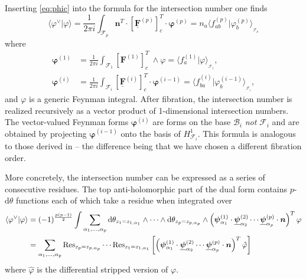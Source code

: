 \documentclass[11pt]{article}
\renewcommand{\d}{\text{d}}
\newcommand{\be}{\begin{equation}}
\newcommand{\ee}{\end{equation}}
\newcommand{\F}{\mathcal{F}}
\newcommand{\B}{\mathcal{B}}
\newcommand{\res}{{\rm Res}}
\newcommand{\vphi}{\varphi}
\newcommand{\bs}[1]{\boldsymbol{#1}}
\newcommand{\mat}[1]{\underline{\boldsymbol{#1}}}
\begin{document}
Inserting \eqref{eq:phic} into the formula for the intersection number one finds 
\be \label{eq:multivariate intersection number}
	\langle \vphi^\vee \vert \vphi \rangle
	= \frac{1}{2 \pi i} \int_{\F_p}  \bs{n}^T \cdot [\mat{F}^{(p)}]_c^T \cdot \bs{\vphi}^{(p)}
	= n_a \langle f^{(p)}_{ab} \vert \vphi^{(p)}_b \rangle_{_{\F_p}}
\ee
where 
\begin{align} \label{eq:phi(1)}
	\bs{\vphi}^{(1)} &= \frac{1}{2 \pi i} \int_{\F_{1}} [\bs{F}^{(1)}]_c^T\ \wedge \vphi 
		= \langle f^{(1)}_a \vert \vphi \rangle_{_{\F_1}},
	\\ \label{eq:phi(i)}
	\bs{\vphi}^{(i)} &= \frac{1}{2 \pi i} \int_{\F_{i}} [\underline{\bs{F}}^{(i)}]_c^T \cdot \bs{\vphi}^{(i-1)}
		= \langle f^{(i)}_{ba} \vert \vphi^{(i-1)}_b \rangle_{_{\F_i}},
\end{align}
and $\vphi$ is a generic Feynman integral. After fibration, the intersection number is realized recursively as a vector product of 1-dimensional intersection numbers. The vector-valued Feynman forms $\bs{\vphi}^{(i)}$ are forms on the base $\B_i$ \emph{not} $\F_i$ and are obtained by projecting $\bs{\vphi}^{(i-1)}$ onto the basis of $H_{\F_i}^1$. This formula is analogous to those derived in \cite{Mizera:2019gea,Frellesvig:2019uqt} -- the difference being that we have chosen a different fibration order. 

More concretely, the intersection number can be expressed as a series of consecutive residues. The top anti-holomorphic part of the dual form contains $p$-$\d\theta$ functions each of which take a residue when integrated over
\begin{align}
	\langle \vphi^\vee \vert \vphi \rangle
	&= (-1)^\frac{p(p-1)}{2} \int \sum_{\alpha_1,\dots,\alpha_p} 
		\d\theta_{z_1 = z_{1,\alpha_1}} \wedge  \cdots \wedge \d\theta_{z_p = z_{p,\alpha_p}} \wedge 
		\left(
			\bs{\psi}^{(1)}_{\alpha_1} \cdot \underline{\bs{\psi}}^{(2)}_{\alpha_2} 
			\cdots \underline{\bs{\psi}}^{(p)}_{\alpha_p} \cdot \bs{n}
		\right)^T \vphi
	\nonumber \\
	&= \sum_{\alpha_1,\dots,\alpha_p} 
		\res_{z_p = z_{p,\alpha_p}}  \cdots \res_{z_1 = z_{1,\alpha_1}} 
		\left[
			\left(
				\bs{\psi}^{(1)}_{\alpha_1} \cdot \underline{\bs{\psi}}^{(2)}_{\alpha_2} 
				\cdots \underline{\bs{\psi}}^{(p)}_{\alpha_p} \cdot \bs{n}
			\right)^T \hat{\vphi}
		\right]
\end{align}
where $\hat{\vphi}$ is the differential stripped version of $\vphi$.
\end{document}
